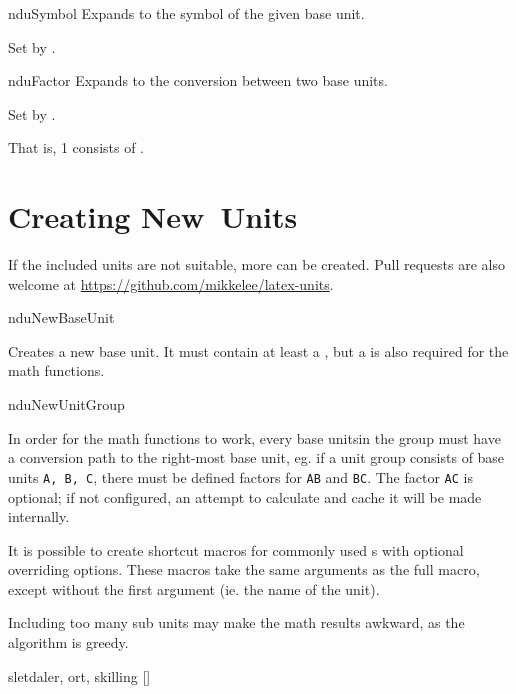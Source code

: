 \documentclass{article}
\begin{document}
\begin{docCommand}
	{nduSymbol}
	{}
	Expands to the symbol of the given base unit.
	
	Set by .
\end{docCommand}

\begin{docCommand}
	{nduFactor}
	{}
	Expands to the conversion between two base units.

	Set by .
\begin{dispExample}
That is, 1  consists of
 .
\end{dispExample}
\end{docCommand}

\clearpage
\section{Creating New Units} %

\label{units:new}
If the included units are not suitable, more can be created. Pull requests are also welcome at \url{https://github.com/mikkelee/latex-units}.

\begin{docCommand}
	{nduNewBaseUnit}
	{}
	
Creates a new base unit. It must contain at least a , but a  is also required for the math functions. %

\end{docCommand}

\begin{docCommand}
	{nduNewUnitGroup}
	{}

	In order for the math functions to work, every base unitsin the group must have a conversion path to the right-most base unit, eg. if a unit group consists of base units \texttt{A, B, C}, there must be defined factors for \texttt{A\rightarrow B} and \texttt{B\rightarrow C}. The factor \texttt{A\rightarrow C} is optional; if not configured, an attempt to calculate and cache it will be made internally.

	It is possible to create shortcut macros for commonly used s with optional overriding options. These macros take the same arguments as the full  macro, except without the first argument (ie. the name of the unit).
	
	Including too many sub units may make the math results awkward, as the algorithm is greedy. %

\begin{dispExample}
	{sletdaler, ort, skilling}
	[\mySldl]
\end{dispExample}

\end{docCommand}
\end{document}
